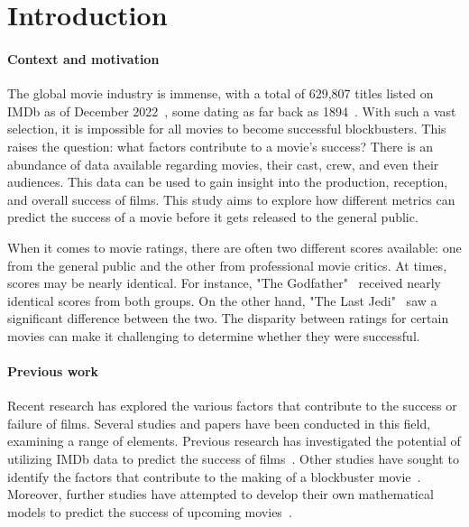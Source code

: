 \section{Introduction}
    \begin{multicols}{2}
        \paragraph{Context and motivation}
            The global movie industry is immense, with a total of 629,807 titles listed on
                IMDb as of December 2022~\cite{imdbStats}, some dating as far back as
                1894~\cite{imdbOldest}.
            With such a vast selection, it is impossible for all movies to become
                successful blockbusters.
            This raises the question: what factors contribute to a movie's success?
            There is an abundance of data available regarding movies, their cast, crew, and
                even their audiences.
            This data can be used to gain insight into the production, reception, and
                overall success of films.
            This study aims to explore how different metrics can predict the success of a
                movie before it gets released to the general public.

            When it comes to movie ratings, there are often two different scores available:
                one from the general public and the other from professional movie critics.
            At times, scores may be nearly identical.
            For instance, "The Godfather"~\cite{rottenTomatoesGodfather} received nearly
                identical scores from both groups.
            On the other hand, "The Last Jedi"~\cite{rottenTomatoesLastJedi} saw a
                significant difference between the two.
            The disparity between ratings for certain movies can make it challenging to
                determine whether they were successful.

        \paragraph{Previous work}
            Recent research has explored the various factors that contribute to the success
                or failure of films.
            Several studies and papers have been conducted in this field, examining a range
                of elements.
            Previous research has investigated the potential of utilizing IMDb data to
                predict the success of films~\cite{dhirRaj}.
            Other studies have sought to identify the factors that contribute to the making
                of a blockbuster movie~\cite{collinsHandSnell}.
            Moreover, further studies have attempted to develop their own mathematical
                models to predict the success of upcoming
                movies~\cite{ahmadDuraisamyYousefBuckles}.


\end{multicols}
